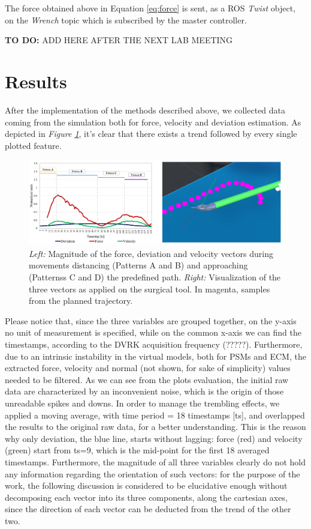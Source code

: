 \documentclass[conference]{IEEEtran}
\begin{document}
The force obtained above in Equation \ref{eq:force} is sent, as a ROS
\textit{Twist} object, on the \textit{Wrench} topic which is
subscribed by the master controller.

\textbf{TO DO:} ADD HERE AFTER THE NEXT LAB MEETING
\section{Results}
After the implementation of the methods described above, we collected
data coming from the simulation both for force, velocity and deviation
estimation. As depicted in   \textit{Figure \ref{fig:plots}}, it’s
clear that there exists a trend followed by every single plotted
feature.

\begin{figure}
    \centering
    \includegraphics[width=\linewidth]{plotandee.png}
    \caption{\textit{Left:} Magnitude of the force, deviation and
    velocity vectors during movements distancing (Patterns A and B)
    and approaching (Patternss C and D) the predefined path.
    \textit{Right:} Visualization of the three vectors as applied on
    the surgical tool. In magenta, samples from the planned
    trajectory.}
    \label{fig:plots}
\end{figure}

Please notice that, since the three variables are grouped together, on
the y-axis no unit of measurement is specified, while on the common
x-axis we can find the timestamps, according to the DVRK acquisition
frequency (?????). Furthermore, due to an intrinsic instability in the
virtual models, both for PSMs and ECM, the extracted force, velocity
and normal (not shown, for sake of simplicity) values needed to be
filtered. As we can see from the plots evaluation, the initial raw
data are characterized by an inconvenient noise, which is the origin
of those unreadable spikes and downs. In order to manage the trembling
effects, we applied a moving average, with time period = 18 timestamps
[ts], and overlapped the results to the original raw data, for a
better understanding. This is the reason why only deviation, the blue
line, starts without lagging: force (red) and velocity (green) start
from ts=9, which is the mid-point for the first 18 averaged
timestamps. Furthermore, the magnitude of all three variables clearly
do not hold any information regarding the orientation of such vectors:
for the purpose of the work, the following discussion is considered to
be elucidative enough without decomposing each vector into its three
components, along the cartesian axes, since the direction of each
vector can be deducted from the trend of the other two.
\end{document}
